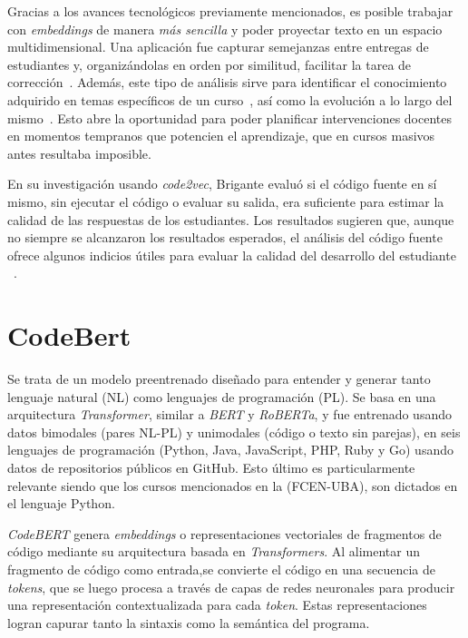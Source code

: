 \documentclass[11pt,a4paper,twoside,openany]{tesis}
\begin{document}
Gracias a los avances tecnológicos previamente mencionados, es posible trabajar con \emph{embeddings} de manera \emph{más sencilla} y poder proyectar texto en un espacio multidimensional. Una aplicación fue capturar semejanzas entre entregas de estudiantes y, organizándolas en orden por similitud, facilitar la tarea de corrección~\cite{simgrade}. Además, este tipo de análisis sirve para identificar el conocimiento adquirido en temas específicos de un curso~\cite{brigante2020evaluation}, así como la evolución a lo largo del mismo~\cite{wu2018zeroshotlearningcode}. Esto abre la oportunidad para poder planificar intervenciones docentes en momentos tempranos que potencien el aprendizaje, que en cursos masivos antes resultaba imposible. 

En su investigación usando \emph{code2vec},  Brigante  evaluó si el código fuente en sí mismo, sin ejecutar el código o evaluar su salida, era suficiente para estimar la calidad de las respuestas de los estudiantes. Los resultados sugieren que, aunque no siempre se alcanzaron los resultados esperados, el análisis del código fuente ofrece algunos indicios útiles para evaluar la calidad del desarrollo del estudiante ~\cite{brigante2020evaluation}.


\section{CodeBert}

Se trata de un modelo preentrenado diseñado para entender y generar tanto lenguaje natural (NL) como lenguajes de programación (PL). Se basa en una arquitectura \emph{Transformer}, similar a \emph{BERT} y \emph{RoBERTa}, y fue entrenado usando datos bimodales (pares NL-PL) y unimodales (código o texto sin parejas), en seis lenguajes de programación (Python, Java, JavaScript, PHP, Ruby y Go) usando datos de repositorios públicos en GitHub. Esto último es particularmente relevante siendo que los cursos mencionados en la (FCEN-UBA), son dictados en el lenguaje Python.

\emph{CodeBERT} genera  \emph{embeddings} o representaciones vectoriales de fragmentos de código mediante su arquitectura basada en \emph{Transformers}. Al alimentar un fragmento de código como entrada,se convierte el código en una secuencia de \emph{tokens}, que se luego procesa a través de capas de redes neuronales para producir una representación contextualizada para cada \emph{token}. Estas representaciones logran capurar tanto la sintaxis como la semántica del programa.
\end{document}
